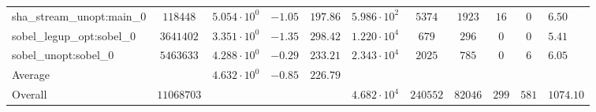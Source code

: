 \begin{tabular}{|l|c|HHc|c|c|c|c|cH|}
sha\_stream\_unopt:main\_0                      & $ 118448   $ & $ 5.054 \cdot 10^{0} $ & $ -1.05 $ & $ 197.86 $ & $ 5.986 \cdot 10^{2}  $ & $ 5374   $ & $ 1923  $ & $ 16  $ & $ 0   $ & $ 6.50    $ \\
sobel\_legup\_opt:sobel\_0                      & $ 3641402  $ & $ 3.351 \cdot 10^{0} $ & $ -1.35 $ & $ 298.42 $ & $ 1.220 \cdot 10^{4}  $ & $ 679    $ & $ 296   $ & $ 0   $ & $ 0   $ & $ 5.41    $ \\
sobel\_unopt:sobel\_0                           & $ 5463633  $ & $ 4.288 \cdot 10^{0} $ & $ -0.29 $ & $ 233.21 $ & $ 2.343 \cdot 10^{4}  $ & $ 2025   $ & $ 785   $ & $ 0   $ & $ 6   $ & $ 6.05    $ \\
\hline
Average                                         & $          $ & $ 4.632 \cdot 10^{0} $ & $ -0.85 $ & $ 226.79 $ & $                     $ & $        $ & $       $ & $     $ & $     $ & $         $ \\
\hline
Overall                                         & $ 11068703 $ & $                    $ & $       $ & $        $ & $ 4.682 \cdot 10^{4}  $ & $ 240552 $ & $ 82046 $ & $ 299 $ & $ 581 $ & $ 1074.10 $ \\
\hline
\end{tabular}
